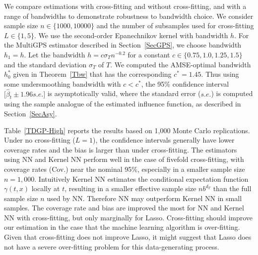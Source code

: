 \documentclass[lettersize, 12pt]{article}
\begin{document}
We compare estimations with cross-fitting and without cross-fitting, and with a range of bandwidths to demonstrate robustness to bandwidth choice. 
We consider sample size $n \in \{1000,10000\}$ and the number of subsamples used for cross-fitting $L \in\{1, 5\}$. 
We use the second-order Epanechnikov kernel with bandwidth $h$. 
For the MultiGPS estimator described in Section~\ref{SecGPS}, we choose bandwidth $h_1=h$.
Let the bandwidth $h=c \sigma_T n^{-0.2}$ for a constant $c\in\{0.75, 1.0,1.25, 1.5\}$
and the standard deviation $\sigma_T$ of $T$.
We computed the AMSE-optimal bandwidth $h^\ast_0$ given in Theorem~\ref{Tbw} that has the corresponding $c^\ast = 1.45$.
Thus using some undersmoothing bandwidth with $c < c^\ast$, the 95\% confidence interval 
$\big[\hat \beta_t \pm 1.96 s.e.\big]$ is asymptotically valid, where
the standard error ($s.e.$) is computed using the sample analogue of the estimated influence function,
as described in Section~\ref{SecAsy}.


Table~\ref{TDGP-High} reports the results based on 1,000 Monte Carlo replications. 
Under no cross-fitting ($L=1$), the confidence intervals generally have lower coverage rates and the bias is larger than under cross-fitting. 
The estimators using NN and Kernel NN perform well in the case of fivefold cross-fitting, with coverage rates (Cov.) near the nominal 95\%, especially in a smaller sample size $n=1,000$. 
Intuitively Kernel NN estimates the conditional expectation function $\gamma(t,x)$ locally at $t$, resulting in a smaller effective sample size $nb^{d_T}$ than the full sample size $n$ used by NN.
Therefore NN may outperform Kernel NN in small samples.
The coverage rate and bias are improved the most for NN and Kernel NN with cross-fitting, but only marginally for Lasso. 
Cross-fitting should improve our estimation in the case that the machine learning algorithm is over-fitting. 
Given that cross-fitting does not improve Lasso, it might suggest that Lasso does not have a severe over-fitting problem for this data-generating process.%
\end{document}
